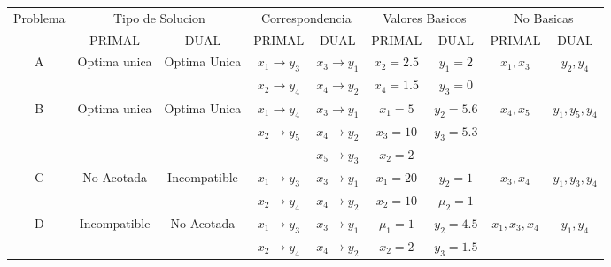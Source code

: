     \begin{tabular}{ccccccccc}
    \hline
    \hline
    Problema & \multicolumn{2}{c}{Tipo de Solucion } & \multicolumn{2}{c}{Correspondencia} & \multicolumn{2}{c}{Valores Basicos} & \multicolumn{2}{c}{No Basicas} \bigstrut[t]\\
            & PRIMAL  & DUAL    & PRIMAL  & DUAL    & PRIMAL  & DUAL    & PRIMAL  & DUAL \bigstrut[b]\\
    \hline
    \hline
    \multirow{2}[2]{*}{A} & \multirow{2}[2]{*}{Optima unica} & \multirow{2}[2]{*}{Optima Unica} & $x_1 \rightarrow y_3$ & $x_3 \rightarrow y_1$ & $x_2 = 2.5$ & $y_1=2$ & \multirow{2}[2]{*}{$x_1 , x_3$} & \multirow{2}[2]{*}{$y_2 , y_4$} \bigstrut[t]\\
            &         &         & $x_2 \rightarrow y_4$ & $x_4 \rightarrow y_2$ & $x_4=1.5$ & $y_3=0$ &         &  \bigstrut[b]\\
    \hline
    \multirow{3}[2]{*}{B} & \multirow{3}[2]{*}{Optima unica} & \multirow{3}[2]{*}{Optima Unica} & $x_1 \rightarrow y_4$ & $x_3 \rightarrow y_1$ & $x_1=5$ & $y_2=5.6$ & \multirow{3}[2]{*}{$x_4, x_5$} & \multirow{3}[2]{*}{$y_1, y_5, y_4$} \bigstrut[t]\\
            &         &         & $x_2 \rightarrow y_5$ & $x_4 \rightarrow y_2$ & $x_3=10$ & $y_3=5.3$ &         &  \\
            &         &         &         & $x_5 \rightarrow y_3$ & $x_2=2$ &         &         &  \bigstrut[b]\\
    \hline
    \multirow{2}[2]{*}{C} & \multirow{2}[2]{*}{No Acotada} & \multirow{2}[2]{*}{Incompatible} & $x_1 \rightarrow y_3$ & $x_3 \rightarrow y_1$ & $x_1=20$ & $y_2=1$ & \multirow{2}[2]{*}{$x_3, x_4$} & \multirow{2}[2]{*}{$y_1, y_3, y_4$} \bigstrut[t]\\
            &         &         & $x_2 \rightarrow y_4$ & $x_4 \rightarrow y_2$ & $x_2=10$ & $ \mu_2=1$ &         &  \bigstrut[b]\\
    \hline
    \multirow{2}[2]{*}{D} & \multirow{2}[2]{*}{Incompatible} & \multirow{2}[2]{*}{No Acotada} & $x_1 \rightarrow y_3$ & $x_3 \rightarrow y_1$ & $\mu_1=1$ & $y_2=4.5$ & \multirow{2}[2]{*}{$x_1, x_3 , x_4$} & \multirow{2}[2]{*}{$y_1, y_4$} \bigstrut[t]\\
            &         &         & $x_2 \rightarrow y_4$ & $x_4 \rightarrow y_2$ & $x_2=2$ & $y_3=1.5$ &         &  \bigstrut[b]\\
    \hline
    \hline
    \end{tabular}%
